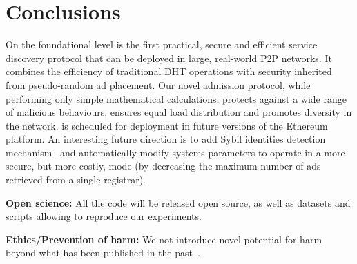 
\vspace{-2mm}
\section{Conclusions}
\vspace{-2mm}
\label{sec:con}

On the foundational level \sysname is the first practical, secure and efficient service discovery protocol that can be deployed in large, real-world P2P networks. It combines the efficiency of traditional DHT operations with security inherited from pseudo-random ad placement. Our novel admission protocol, while performing only simple mathematical calculations, protects against a wide range of malicious behaviours, ensures equal load distribution and promotes diversity in the network.
\sysname is scheduled for deployment in future versions of the Ethereum platform. 
An interesting future direction is to add Sybil identities detection mechanism~\cite{cholez2010efficient} and automatically modify systems parameters to operate in a more secure, but more costly, mode (\eg by decreasing the maximum number of ads retrieved from a single registrar). 


{\footnotesize

\smallskip

\noindent
\textbf{Open science:} All the code will be released open source, as well as datasets and scripts allowing to reproduce our experiments.

\smallskip

\footnotesize
\noindent
\textbf{Ethics/Prevention of harm:} We not introduce novel potential for harm beyond what has been published in the past~\cite{marcus2018low,henningsen2019eclipsing}.}